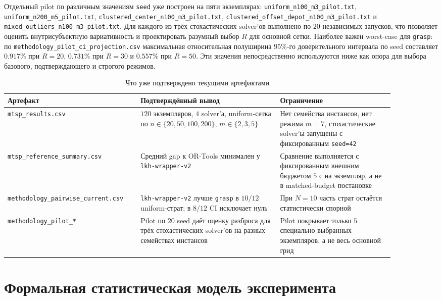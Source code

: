 \begin{refsection}
Отдельный pilot по различным значениям \texttt{seed} уже построен на пяти экземплярах: \texttt{uniform\_n100\_m3\_pilot.txt}, \texttt{uniform\_n200\_m5\_pilot.txt}, \texttt{clustered\_center\_n100\_m3\_pilot.txt}, \texttt{clustered\_offset\_depot\_n100\_m3\_pilot.txt} и \texttt{mixed\_outliers\_n100\_m3\_pilot.txt}. Для каждого из трёх стохастических solver'ов выполнено по \(20\) независимых запусков, что позволяет оценить внутрисубъектную вариативность и проектировать разумный выбор \(R\) для основной сетки. Наиболее важен worst-case для \texttt{grasp}: по \texttt{methodology\_pilot\_ci\_projection.csv} максимальная относительная полуширина \(95\%\)-го доверительного интервала по seed составляет \(0.917\%\) при \(R=20\), \(0.731\%\) при \(R=30\) и \(0.557\%\) при \(R=50\). Эти значения непосредственно используются ниже как опора для выбора базового, подтверждающего и строгого режимов.

\begin{table}[h]
\centering
\caption{Что уже подтверждено текущими артефактами}
\begin{tabular}{p{0.29\linewidth}p{0.33\linewidth}p{0.27\linewidth}}
\toprule
Артефакт & Подтверждённый вывод & Ограничение \\
\midrule
\texttt{mtsp\_results.csv} & \(120\) экземпляров, \(4\) solver'а, uniform-сетка по \(n \in \{20,50,100,200\}\), \(m \in \{2,3,5\}\) & Нет семейства инстансов, нет режима \(m=7\), стохастические solver'ы запущены с фиксированным \texttt{seed=42} \\
\texttt{mtsp\_reference\_summary.csv} & Средний gap к OR-Tools минимален у \texttt{lkh-wrapper-v2} & Сравнение выполняется с фиксированным внешним бюджетом \(5\) с на экземпляр, а не в matched-budget постановке \\
\texttt{methodology\_pairwise\_current.csv} & \texttt{lkh-wrapper-v2} лучше \texttt{grasp} в \(10/12\) uniform-страт; в \(8/12\) CI исключает нуль & При \(N=10\) часть страт остаётся статистически спорной \\
\texttt{methodology\_pilot\_*} & Pilot по \(20\) seed даёт оценку разброса для трёх стохастических solver'ов на разных семействах инстансов & Pilot покрывает только \(5\) специально выбранных экземпляров, а не весь основной грид \\
\bottomrule
\end{tabular}
\end{table}

\section{Формальная статистическая модель эксперимента}


\end{refsection}
